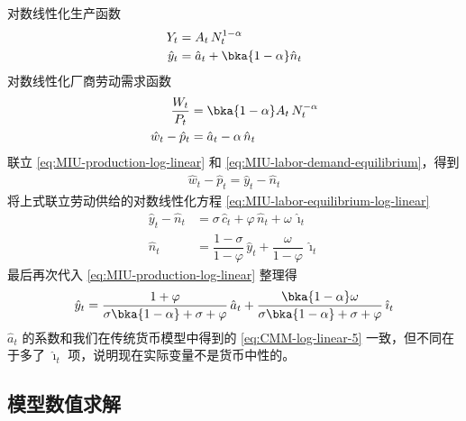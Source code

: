对数线性化生产函数
\begin{align}
    Y_t&=A_t\,N_t^{1-\alpha}\notag\\
    \hat y_t&=\hat a_t+\bka{1-\alpha}\hat n_t\label{eq:MIU-production-log-linear}
\end{align}
对数线性化厂商劳动需求函数
\begin{align}
    \dfrac{W_t}{P_t}&=\bka{1-\alpha}A_t\,N^{-\alpha}_t\notag\\
    \hat w_t-\hat p_t&=\hat a_t-\alpha\,\hat n_t\label{eq:MIU-labor-demand-equilibrium}
\end{align}
联立 \ref{eq:MIU-production-log-linear} 和 \ref{eq:MIU-labor-demand-equilibrium}，得到
\begin{align}
    \hat w_t-\hat p_t=\hat y_t-\hat n_t\label{eq:MIU-production-labor-demand-log-linear}
\end{align}
将上式联立劳动供给的对数线性化方程 \ref{eq:MIU-labor-equilibrium-log-linear}
\begin{align*}
    \hat y_t-\hat n_t&=\sigma\,\hat c_t+\varphi\,\hat n_t+\omega\,\hat\imath_t\\
    \hat n_t&=\dfrac{1-\sigma}{1-\varphi}\,\hat y_t+\dfrac{\omega}{1-\varphi}\,\hat\imath_t
\end{align*}
最后再次代入 \ref{eq:MIU-production-log-linear} 整理得
\begin{align*}
    \hat y_t=\dfrac{1+\varphi}{\sigma\bka{1-\alpha}+\sigma+\varphi}\,\hat a_t+\dfrac{\bka{1-\alpha}\omega}{\sigma\bka{1-\alpha}+\sigma+\varphi}\,\hat\imath_t
\end{align*}
\(\hat a_t\) 的系数和我们在传统货币模型中得到的 \ref{eq:CMM-log-linear-5} 一致，但不同在于多了 \(\hat\imath_t\) 项，说明现在实际变量不是货币中性的。

\subsection{模型数值求解}


